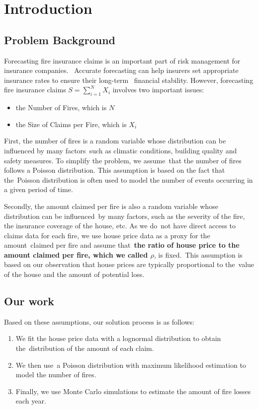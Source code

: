 \documentclass[12pt]{article}  %
\begin{document}
\section{Introduction}
\subsection{Problem Background}
Forecasting fire insurance claims is an important part of risk management for insurance companies. \
Accurate forecasting can help insurers set appropriate insurance rates to ensure their long-term \ 
financial stability. However, forecasting fire insurance claims $S=\sum^{N}_{i=1}X_i$ involves two important issues: \ 

\begin{itemize}
    \item the Number of Fires, which is $N$
    \item the Size of Claims per Fire, which is $X_i$
\end{itemize}

First, the number of fires is a random variable whose distribution can be influenced by many factors\ 
such as climatic conditions, building quality and safety measures. To simplify the problem, we assume\ 
that the number of fires follows a Poisson distribution. This assumption is based on the fact that the\ 
Poisson distribution is often used to model the number of events occurring in a given period of time. \textsuperscript{\cite{poisson}}

Secondly, the amount claimed per fire is also a random variable whose distribution can be influenced\ 
by many factors, such as the severity of the fire, the insurance coverage of the house, etc. As we do\
not have direct access to claims data for each fire, we use house price data as a proxy for the amount\
claimed per fire and assume that\
\textbf{the ratio of house price to the amount claimed per fire, which we called  $ \rho $}, is fixed.\
This assumption is based on our observation that house prices are typically proportional to the\
value of the house and the amount of potential loss.

\subsection{Our work}

Based on these assumptions, our solution process is as follows:    

\begin{enumerate}[\bfseries 1.]
    \item We fit the house price data with a lognormal distribution to obtain the\ 
    distribution of the amount of each claim.\textsuperscript{\cite{house1, house2}}
    \item We then use\ 
    a Poisson distribution with maximum likelihood estimation to model the number of fires.
    \item Finally, we use Monte Carlo simulations to estimate the amount of fire losses each year.
\end{enumerate}
\end{document}
